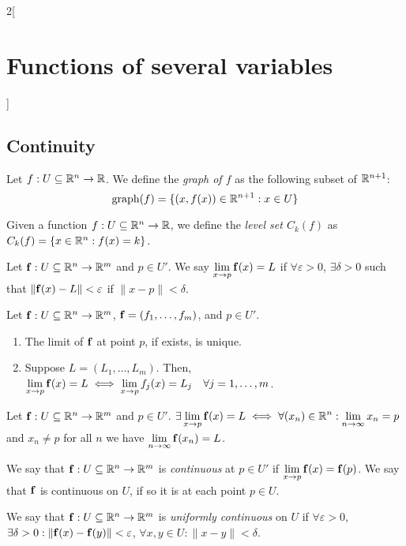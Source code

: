\documentclass[../../../main.tex]{subfiles}
\begin{document}
\begin{multicols}{2}[\section{Functions of several variables}]
  \subsection{Continuity}
  \begin{definition}
    Let $f:U\subseteq\mathbb{R}^n\rightarrow\mathbb{R} $. We define the \textit{graph of $f$} as the following subset of $\mathbb{R}^{n+1}$: $$\text{graph}(f)=\{(x,f(x))\in\mathbb{R}^{n+1}:x\in U\}$$
  \end{definition}
  \begin{definition}
    Given a function $f:U\subseteq\mathbb{R}^n\rightarrow\mathbb{R} $, we define the \textit{level set $C_k(f)$} as $C_k(f)=\{x\in\mathbb{R}^n:f(x)=k\}$.
  \end{definition}
  \begin{definition}
    Let $\boldsymbol{\mathrm{f}}:U\subseteq\mathbb{R}^n\rightarrow\mathbb{R}^m$ and $p\in U'$. We say $\displaystyle\lim_{x\to p}\boldsymbol{\mathrm{f}}(x)=L$ if $\forall\varepsilon>0$, $\exists\delta>0$ such that $\|\boldsymbol{\mathrm{f}}(x)-L\|<\varepsilon$ if $\|x-p\|<\delta$.
  \end{definition}
  \begin{prop}
    Let $\boldsymbol{\mathrm{f}}:U\subseteq\mathbb{R}^n\rightarrow\mathbb{R}^m$, $\boldsymbol{\mathrm{f}}=(f_1,\ldots,f_m)$, and $p\in U'$.
    \begin{enumerate}
      \item The limit of $\boldsymbol{\mathrm{f}}$ at point $p$, if exists, is unique.
      \item Suppose $L=(L_1,\ldots,L_m)$. Then, $\displaystyle\lim_{x\to p}\boldsymbol{\mathrm{f}}(x)=L\iff\lim_{x\to p}f_j(x)=L_j\quad\forall j=1,\ldots,m$.
    \end{enumerate}
  \end{prop}
  \begin{lemma}
    Let $\boldsymbol{\mathrm{f}}:U\subseteq\mathbb{R}^n\rightarrow\mathbb{R}^m$ and $p\in U'$. $\displaystyle\exists\lim_{x\to p}\boldsymbol{\mathrm{f}}(x)=L\iff\forall(x_n)\in\mathbb{R}^n:\lim_{n\to\infty}x_n=p$ and $x_n\ne p$ for all $n$ we have $\displaystyle\lim_{n\to \infty}\boldsymbol{\mathrm{f}}(x_n)=L$.
  \end{lemma}
  \begin{definition}
    We say that $\boldsymbol{\mathrm{f}}:U\subseteq\mathbb{R}^n\rightarrow\mathbb{R}^m$ is \textit{continuous} at $p\in U'$ if $\displaystyle\lim_{x\to p}\boldsymbol{\mathrm{f}}(x)=\boldsymbol{\mathrm{f}}(p)$. We say that $\boldsymbol{\mathrm{f}}$ is continuous on $U$, if so it is at each point $p\in U$.
  \end{definition}
  \begin{definition}
    We say that $\boldsymbol{\mathrm{f}}:U\subseteq\mathbb{R}^n\rightarrow\mathbb{R}^m$ is \textit{uniformly continuous} on $U$ if $\forall\varepsilon>0$, $\exists\delta>0:\|\boldsymbol{\mathrm{f}}(x)-\boldsymbol{\mathrm{f}}(y)\|<\varepsilon$, $\forall x,y\in U:\|x-y\|<\delta$.

\end{definition}
\end{multicols}
\end{document}
